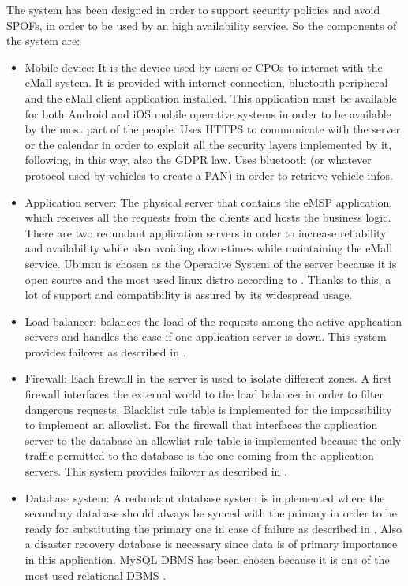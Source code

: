 The system has been designed in order to support security policies and avoid \acp{SPOF}, in order to be used by an high availability service. So the components of the system are:
\begin{itemize}
    \item Mobile device: It is the device used by users or \acp{CPO} to interact with the \ac{eMall} system. It is provided with internet connection, bluetooth peripheral and the \ac{eMall} client application installed. This application must be available for both Android and iOS mobile operative systems in order to be available by the most part of the people.
    Uses \ac{HTTPS} to communicate with the server or the calendar in order to exploit all the security layers implemented by it, following, in this way, also the \ac{GDPR} law. Uses bluetooth (or whatever protocol used by vehicles to create a \ac{PAN}) in order to retrieve vehicle infos.
    \item Application server: The physical server that contains the \ac{eMSP} application, which receives all the requests from the clients and hosts the business logic. There are two redundant application servers in order to increase reliability and availability while also avoiding down-times while maintaining the \ac{eMall} service. 
    Ubuntu is chosen as the Operative System of the server because it is open source and the most used linux distro according to \cite{ref:most-popular-linux-distro}. Thanks to this, a lot of support and compatibility is assured by its widespread usage.
    \item Load balancer: balances the load of the requests among the active application servers and handles the case if one application server is down. This system provides failover as described in \cite{ref:redundant-load-balancers}.
    \item Firewall: Each firewall in the server is used to isolate different zones. A first firewall interfaces the external world to the load balancer in order to filter dangerous requests.
    Blacklist rule table is implemented for the impossibility to implement an allowlist. For the firewall that interfaces the application server to the database an allowlist rule table is implemented because the only traffic permitted to the database is the one coming from the application servers. This system provides failover as described in \cite{ref:redundant-firewalls}.
    \item Database system: A redundant database system is implemented where the secondary database should always be synced with the primary in order to be ready for substituting the primary one in case of failure as described in \cite{ref:redundant-databases}. Also a disaster recovery database is necessary since data is of primary importance in this application. MySQL DBMS has been chosen because it is one of the most used relational DBMS \cite{ref:most-popular-RDBMS}.
\end{itemize}

